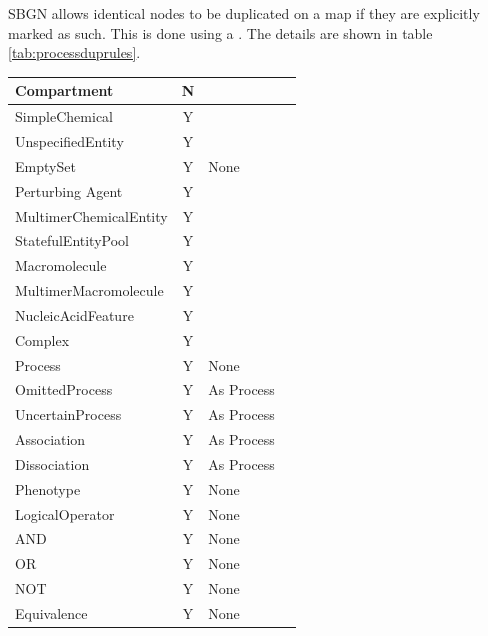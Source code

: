 SBGN allows identical nodes to be duplicated on a map if they are
explicitly marked as such. This is done using a . The details are shown in table \ref{tab:processduprules}.


\begin{center}
\label{tab:processduprules}
\begin{footnotesize}
\tablelasttail{\hline}
\begin{supertabular}{|l|c|p{4cm}|p{3.5cm}|}\hline
Compartment   & N & & \\\hline
SimpleChemical & Y &  & \\\hline
UnspecifiedEntity & Y &  & \\\hline
EmptySet & Y & None & \\\hline
Perturbing Agent & Y &  & \\\hline

MultimerChemicalEntity & Y &  & \\\hline
StatefulEntityPool & Y &  & \\\hline
Macromolecule & Y &  & \\\hline
MultimerMacromolecule & Y &  & \\\hline
Nucleic\-Acid\-Feature & Y &  & \\\hline
Complex & Y &  & \\\hline
Process & Y & None & \\\hline
OmittedProcess & Y & As Process  & \\\hline
UncertainProcess & Y & As Process  & \\\hline
Association & Y & As Process  & \\\hline
Dissociation & Y & As Process  & \\\hline
Phenotype & Y & None & \\\hline
LogicalOperator & Y & None & \\\hline
AND & Y & None & \\\hline
OR & Y & None & \\\hline
NOT & Y & None & \\\hline
Equivalence & Y & None & \\\hline
\end{supertabular}
\end{footnotesize}
\end{center}


